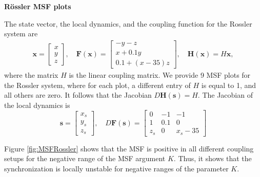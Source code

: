 \documentclass[%
 reprint,
 amsmath,amssymb,
 aip,
]{revtex4-2}
\def \bF {\pmb{F}}
\def \bH {\pmb{H}}
\def \bx {\pmb{x}}
\def \bs {\pmb{s}}
\theoremstyle{italichead}
\theoremstyle{definition}
\begin{document}
{\textbf{R\"ossler MSF plots}

The state vector, the local dynamics, and the coupling function for the Rossler system are 
\begin{align}
    \bx = \begin{bmatrix}
        x \\ y \\ z
    \end{bmatrix}, \quad \bF (\bx) = \begin{bmatrix}
        -y - z \\
        x + 0.1y \\
        0.1 + ( x-35 )z
    \end{bmatrix}, \quad \bH(\bx) = H \bx,
\end{align}
where the matrix $H$ is the linear coupling matrix. 
We provide 9 MSF plots for the Rossler system, where for each plot, a different entry of $H$ is equal to 1, and all others are zero.
It  follows that the Jacobian $D\bH(\bs) = H$.
The Jacobian of the local dynamics is
\begin{equation}
    \bs = \begin{bmatrix}
        x_s \\ y_s \\ z_s
    \end{bmatrix}, \quad D \bF (\bs) = \begin{bmatrix}
        0 & -1 & -1 \\
        1 & 0.1 & 0 \\
        z_s & 0 & x_s-35
    \end{bmatrix}
\end{equation}


Figure \ref{fig:MSFRossler} shows that the MSF is positive in all different coupling setups for the negative range of the MSF argument $K$. 
Thus, it shows that the synchronization is locally unstable for negative ranges of the parameter $K$.


}
\end{document}
